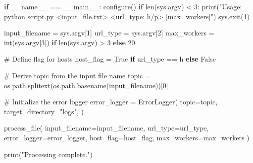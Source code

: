 \documentclass[
  titlepage]{article}
\newenvironment{Shaded}{\begin{snugshade}}{\end{snugshade}}
\newcommand{\BuiltInTok}[1]{\textcolor[rgb]{0.00,0.23,0.31}{#1}}
\newcommand{\CommentTok}[1]{\textcolor[rgb]{0.37,0.37,0.37}{#1}}
\newcommand{\ControlFlowTok}[1]{\textcolor[rgb]{0.00,0.23,0.31}{\textbf{#1}}}
\newcommand{\DecValTok}[1]{\textcolor[rgb]{0.68,0.00,0.00}{#1}}
\newcommand{\NormalTok}[1]{\textcolor[rgb]{0.00,0.23,0.31}{#1}}
\newcommand{\OperatorTok}[1]{\textcolor[rgb]{0.37,0.37,0.37}{#1}}
\newcommand{\StringTok}[1]{\textcolor[rgb]{0.13,0.47,0.30}{#1}}
\newcommand{\VariableTok}[1]{\textcolor[rgb]{0.07,0.07,0.07}{#1}}
\begin{document}
\begin{Shaded}
\begin{Highlighting}[]
\ControlFlowTok{if} \VariableTok{\_\_name\_\_} \OperatorTok{==} \StringTok{\textquotesingle{}\_\_main\_\_\textquotesingle{}}\NormalTok{:}
\NormalTok{    configure()}
    \ControlFlowTok{if} \BuiltInTok{len}\NormalTok{(sys.argv) }\OperatorTok{\textless{}} \DecValTok{3}\NormalTok{:}
        \BuiltInTok{print}\NormalTok{(}\StringTok{"Usage: python script.py \textless{}input\_file.txt\textgreater{} \textless{}url\_type: h/p\textgreater{} [max\_workers]"}\NormalTok{)}
\NormalTok{        sys.exit(}\DecValTok{1}\NormalTok{)}
    
\NormalTok{    input\_filename }\OperatorTok{=}\NormalTok{ sys.argv[}\DecValTok{1}\NormalTok{]}
\NormalTok{    url\_type }\OperatorTok{=}\NormalTok{ sys.argv[}\DecValTok{2}\NormalTok{]}
\NormalTok{    max\_workers }\OperatorTok{=} \BuiltInTok{int}\NormalTok{(sys.argv[}\DecValTok{3}\NormalTok{]) }\ControlFlowTok{if} \BuiltInTok{len}\NormalTok{(sys.argv) }\OperatorTok{\textgreater{}} \DecValTok{3} \ControlFlowTok{else} \DecValTok{20}

    \CommentTok{\# Define flag for hosts}
\NormalTok{    host\_flag }\OperatorTok{=} \VariableTok{True} \ControlFlowTok{if}\NormalTok{ url\_type }\OperatorTok{==} \StringTok{\textquotesingle{}h\textquotesingle{}} \ControlFlowTok{else} \VariableTok{False}

    \CommentTok{\# Derive topic from the input file name}
\NormalTok{    topic }\OperatorTok{=}\NormalTok{ os.path.splitext(os.path.basename(input\_filename))[}\DecValTok{0}\NormalTok{]}

    \CommentTok{\# Initialize the error logger}
\NormalTok{    error\_logger }\OperatorTok{=}\NormalTok{ ErrorLogger(}
\NormalTok{        topic}\OperatorTok{=}\NormalTok{topic,}
\NormalTok{        target\_directory}\OperatorTok{=}\StringTok{"logs"}\NormalTok{,}
\NormalTok{        )}

\NormalTok{    process\_file(}
\NormalTok{        input\_filename}\OperatorTok{=}\NormalTok{input\_filename,}
\NormalTok{        url\_type}\OperatorTok{=}\NormalTok{url\_type,}
\NormalTok{        error\_logger}\OperatorTok{=}\NormalTok{error\_logger,}
\NormalTok{        host\_flag}\OperatorTok{=}\NormalTok{host\_flag,}
\NormalTok{        max\_workers}\OperatorTok{=}\NormalTok{max\_workers}
\NormalTok{        )}
    
    \BuiltInTok{print}\NormalTok{(}\StringTok{"Processing complete."}\NormalTok{)}
\end{Highlighting}
\end{Shaded}
\end{document}
